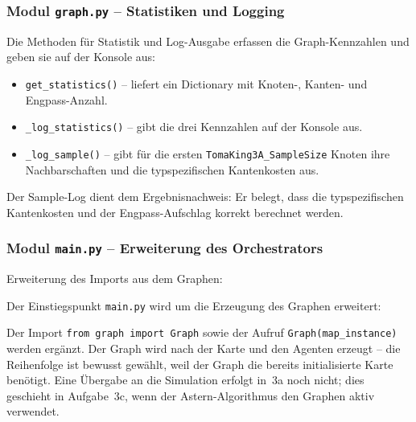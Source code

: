 \subsubsection{Modul \texttt{graph.py} – Statistiken und Logging}

Die Methoden für Statistik und Log-Ausgabe erfassen die Graph-Kennzahlen und geben sie auf der Konsole aus:



\begin{itemize}
    \item \texttt{get\_statistics()} -- liefert ein Dictionary mit Knoten-, Kanten- und Engpass-Anzahl.
    \item \texttt{\_log\_statistics()} -- gibt die drei Kennzahlen auf der Konsole aus.
    \item \texttt{\_log\_sample()} -- gibt für die ersten \texttt{TomaKing3A\_SampleSize} Knoten ihre Nachbarschaften und die typspezifischen Kantenkosten aus.
\end{itemize}

Der Sample-Log dient dem Ergebnisnachweis: Er belegt, dass die typspezifischen Kantenkosten und der Engpass-Aufschlag korrekt berechnet werden.


\subsubsection{Modul \texttt{main.py} – Erweiterung des Orchestrators}

Erweiterung des Imports aus dem Graphen:



Der Einstiegspunkt \texttt{main.py} wird um die Erzeugung des Graphen erweitert:



Der Import \texttt{from graph import Graph} sowie der Aufruf \texttt{Graph(map\_instance)} werden ergänzt. Der Graph wird nach der Karte und den Agenten erzeugt -- die Reihenfolge ist bewusst gewählt, weil der Graph die bereits initialisierte Karte benötigt. Eine Übergabe an die Simulation erfolgt in~3a noch nicht; dies geschieht in Aufgabe~3c, wenn der \acs{Astern}-Algorithmus den Graphen aktiv verwendet.

